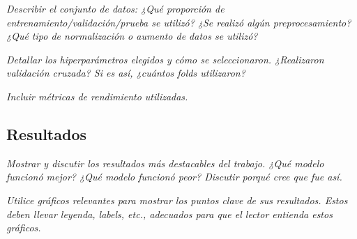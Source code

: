 \documentclass[11pt]{article}
\begin{document}
\textit{Describir el conjunto de datos: ¿Qué proporción de entrenamiento/validación/prueba se utilizó? ¿Se realizó algún preprocesamiento? ¿Qué tipo de normalización o aumento de datos se utilizó?}

\textit{Detallar los hiperparámetros elegidos y cómo se seleccionaron. ¿Realizaron validación cruzada? Si es así, ¿cuántos folds utilizaron?}

\textit{Incluir métricas de rendimiento utilizadas.}

\subsection{Resultados}
\textit{Mostrar y discutir los resultados más destacables del trabajo. ¿Qué modelo funcionó mejor? ¿Qué modelo funcionó peor? Discutir porqué cree que fue así.}

\textit{Utilice gráficos relevantes para mostrar los puntos clave de sus resultados. Estos deben llevar leyenda, labels, etc., adecuados para que el lector entienda estos gráficos.}
\end{document}

